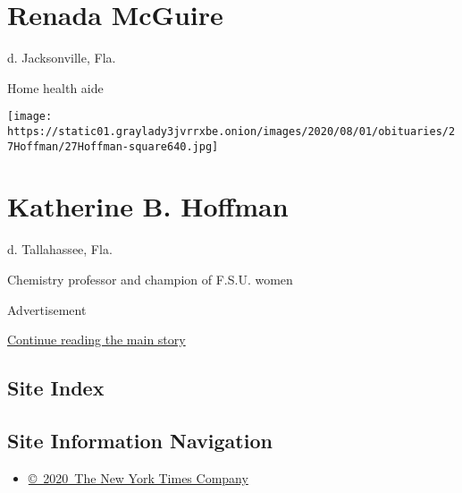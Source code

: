 \hypertarget{renada-mcguire}{%
\section{Renada McGuire}\label{renada-mcguire}}

d. Jacksonville, Fla.

Home health aide

\texttt{[image: https://static01.graylady3jvrrxbe.onion/images/2020/08/01/obituaries/27Hoffman/27Hoffman-square640.jpg]}

\hypertarget{katherine-b-hoffman}{%
\section{Katherine B. Hoffman}\label{katherine-b-hoffman}}

d. Tallahassee, Fla.

Chemistry professor and champion of F.S.U. women

Advertisement

\protect\hyperlink{after-bottom}{Continue reading the main story}

\hypertarget{site-index}{%
\subsection{Site Index}\label{site-index}}

\hypertarget{site-information-navigation}{%
\subsection{Site Information
Navigation}\label{site-information-navigation}}

\begin{itemize}
\tightlist
\item
  \href{https://help.nytimes3xbfgragh.onion/hc/en-us/articles/115014792127-Copyright-notice}{©~2020~The
  New York Times Company}
\end{itemize}

